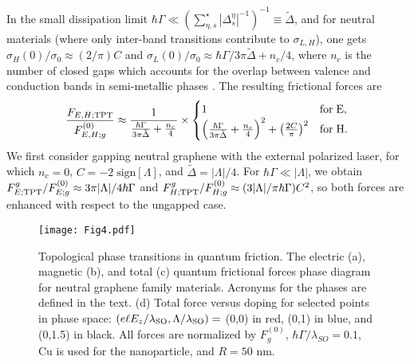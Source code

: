 \documentclass[10pt,aps,prl,superscriptaddress,showpacs,twocolumn]{revtex4-1}
\begin{document}
In the small dissipation limit $\hbar \Gamma \ll (\sum^{\star}_{\eta,s} |\Delta^{\eta}_s|^{-1})^{-1} \equiv 
\tilde{\Delta}$, and for neutral materials (where only inter-band transitions contribute to $\sigma_{L,H}$), one gets $\sigma_{H}(0)/\sigma_0 \approx (2/\pi) C$ and
$\sigma_{L}(0)/\sigma_0 \approx \hbar \Gamma/3 \pi \tilde{\Delta} +n_c/4$,  where $n_c$ is the number of closed gaps which accounts for the overlap between valence and conduction bands in semi-metallic phases  \cite{Tse2010,Nicol2012,KortKamp2017}.  
The resulting frictional forces are  
%
\begin{equation}
\frac{F_{E,H;{\rm TPT}}}{F^{(0)}_{E,H;g}} \approx \frac{1}{\frac{\hbar \Gamma}{3 \pi \tilde{\Delta}} + \frac{n_c}{4}}
\times
\begin{cases}
1 & {\rm for \; E}, \\
\left(\frac{\hbar \Gamma}{3 \pi \tilde{\Delta}} + \frac{n_c}{4}\right)^2 + \left(\frac{2C}{\pi}\right)^2 & {\rm for \; H}.
\end{cases}
\label{TPT}
\end{equation}
We first consider gapping neutral graphene with the external polarized laser, for which $n_c=0$, $C=-2 \; \text{sign}[\Lambda]$, and $\tilde{\Delta}= |\Lambda|/4$. For $\hbar \Gamma \ll |\Lambda|$, we obtain 
$F^g_{E;{\rm TPT}}/F_{E;g}^{(0)} \approx 3 \pi |\Lambda|/4 \hbar \Gamma$ and
$F^g_{H;{\rm TPT}}/F_{H;g}^{(0)} \approx (3 |\Lambda|/ \pi \hbar \Gamma) C^2$, so
both forces are enhanced with respect to the ungapped case.


\begin{figure}[t]
\centering
\texttt{[image: Fig4.pdf]}
\caption{Topological phase transitions in quantum friction. The electric (a), magnetic (b), and total (c) quantum frictional forces phase diagram for neutral graphene family materials. Acronyms for the phases are defined in the text. (d) Total force versus doping for selected points in phase space: $(e \ell E_z/\lambda_{\rm SO}, \Lambda/\lambda_{\rm SO})=$
(0,0) in red, (0,1) in blue, and (0,1.5) in black. All forces are normalized by $F_g^{(0)}$, $\hbar \Gamma / \lambda_{SO}=0.1$, Cu is used for the nanoparticle, and $R=50$ nm.} 
\label{Fig4}
\end{figure}
\end{document}
